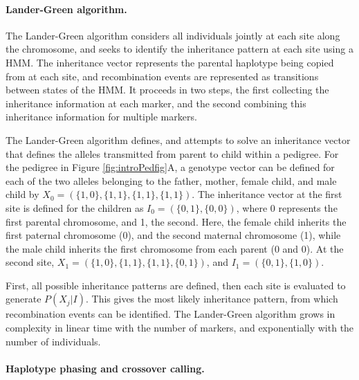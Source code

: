 \paragraph{Lander-Green algorithm.}

The Lander-Green algorithm\cite{Lander1987} considers all individuals jointly at each site along the chromosome, and seeks to identify the inheritance pattern at each site using a HMM.
The inheritance vector represents the parental haplotype being copied from at each site, and recombination events are represented as transitions between states of the HMM.
It proceeds in two steps, the first collecting the inheritance information at each marker, and the second combining this inheritance information for multiple markers.

The Lander-Green algorithm defines, and attempts to solve an inheritance vector that defines the alleles transmitted from parent to child within a pedigree.
For the pedigree in Figure \ref{fig:introPedfig}A, a genotype vector can be defined for each of the two alleles belonging to the father, mother, female child, and male child by $X_0 = ( \{1,0\}, \{1,1\}, \{1,1\}, \{1,1\} )$.
The inheritance vector at the first site is defined for the children as $I_0 = ( \{0,1\}, \{0,0\} )$, where 0 represents the first parental chromosome, and 1, the second.
Here, the female child inherits the first paternal chromosome (0), and the second maternal chromosome (1), while the male child inherits the first chromosome from each parent (0 and 0).
At the second site, $X_1 = ( \{1,0\}, \{1,1\}, \{1,1\}, \{0,1\} )$, and $I_1 = ( \{0,1\}, \{1,0\} )$.

First, all possible inheritance patterns are defined, then each site is evaluated to generate $P( X_j | I )$.
This gives the most likely inheritance pattern, from which recombination events can be identified.
The Lander-Green algorithm grows in complexity in linear time with the number of markers, and exponentially with the number of individuals.


\paragraph{Haplotype phasing and crossover calling.}

